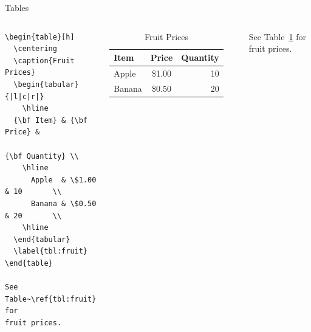 \documentclass[aspectratio=1610]{beamer}
\begin{document}
\begin{frame}[fragile]{Tables}
  \begin{columns}[T]
      \begin{lstlisting}
\begin{table}[h]
  \centering
  \caption{Fruit Prices}
  \begin{tabular}{|l|c|r|}
    \hline
  {\bf Item} & {\bf Price} &
                  {\bf Quantity} \\
    \hline
      Apple  & \$1.00 & 10       \\
      Banana & \$0.50 & 20       \\
    \hline
  \end{tabular}
  \label{tbl:fruit}
\end{table}

See Table~\ref{tbl:fruit} for
fruit prices.
      \end{lstlisting}
\begin{table}[h]
  \centering
  \caption{Fruit Prices}
  \begin{tabular}{|l|c|r|}
    \hline
      {\bf Item} & {\bf Price}  & {\bf Quantity} \\
    \hline
      Apple  & \$1.00 & 10       \\
      Banana & \$0.50 & 20       \\
    \hline
  \end{tabular}
  \label{tbl:fruit}
\end{table}

See Table~\ref{tbl:fruit} for
fruit prices.

\vspace{1cm}


  \end{columns}
\end{frame}
\end{document}
